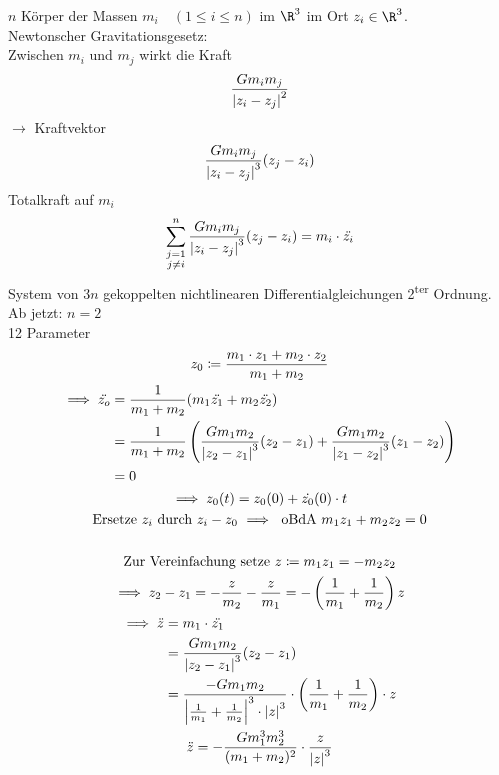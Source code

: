 \begin{bsp*}[note = Zwei Körper Problem]
	$n$ Körper der Massen $m_i \quad (1 \leq i \leq n)$ im $\R^3$ im Ort $z_i \in \R^3$. \\
	Newtonscher Gravitationsgesetz: \\
	Zwischen $m_i$ und $m_j$ wirkt die Kraft
	\[ \frac{G m_i m_j}{\abs{z_i - z_j}^2} \]
	$\rightarrow$ Kraftvektor
	\[ \frac{G m_i m_j}{\abs{z_i - z_j}^3} (z_j - z_i) \]
	Totalkraft auf $m_i$
	\[ \sum_{\substack{j = 1 \\ j \neq i}}^n \frac{G m_i m_j}{\abs{z_i - z_j}^3} (z_j - z_i) = m_i \cdot \ddot{z_i} \]
	System von $3n$ gekoppelten nichtlinearen Differentialgleichungen 2\textsuperscript{ter} Ordnung. \\
	Ab jetzt: $n=2$ \\
	12 Parameter \\
	\begin{gather*}
		z_0 \coloneqq \frac{m_1 \cdot z_1 + m_2 \cdot z_2}{m_1 + m_2} \\
		\begin{split}
			\implies \ddot{z_o}
				&= \frac{1}{m_1 + m_2} ( m_1 \ddot{z_1} + m_2 \ddot{z_2} ) \\
				&= \frac{1}{m_1 + m_2} \left( \frac{G m_1 m_2}{\abs{z_2 - z_1}^3} (z_2 - z_1) + \frac{G m_1 m_2}{\abs{z_1 - z_2}^3} (z_1 - z_2) \right) \\
				&= 0
		\end{split} \\
		\implies z_0(t) = z_0(0) + \dot{z_0}(0) \cdot t \\
		\text{Ersetze $z_i$ durch $z_i - z_0$ $\implies$ oBdA $m_1 z_1 + m_2 z_2 = 0$} \\
		\\
		\text{Zur Vereinfachung setze } z \coloneqq m_1 z_1 = -m_2 z_2 \\
		\implies z_2 - z_1 = - \frac{z}{m_2} - \frac{z}{m_1} = -\left( \frac{1}{m_1} + \frac{1}{m_2} \right) z \\
		\begin{split}
			\implies \ddot{z}
				&= m_1 \cdot \ddot{z_1} \\
				&= \frac{G m_1 m_2}{\abs{z_2 - z_1}^3} ( z_2 - z_1 ) \\
				&= \frac{ -G m_1 m_2}{\abs{\frac{1}{m_1} + \frac{1}{m_2}}^3 \cdot \abs{z}^3} \cdot \left( \frac{1}{m_1} + \frac{1}{m_2} \right) \cdot z
		\end{split} \\
		\ddot{z} = -\frac{G m_1^3 m_2^3}{(m_1 + m_2)^2} \cdot \frac{z}{\abs{z}^3} \\

\end{gather*}
\end{bsp*}
